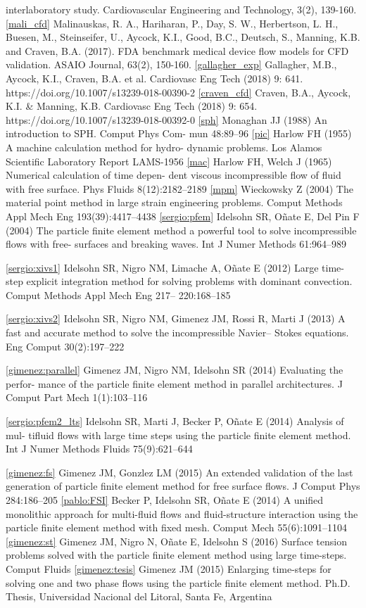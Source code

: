 interlaboratory study. Cardiovascular Engineering and Technology, 3(2), 139-160.
\ref{mali_cfd} Malinauskas, R. A., Hariharan, P., Day, S. W., Herbertson, L. H., Buesen, M., Steinseifer, U., Aycock, K.I., Good, B.C., Deutsch,
S., Manning, K.B. and Craven, B.A. (2017). FDA benchmark medical device flow models for CFD validation. ASAIO Journal,
63(2), 150-160.
\ref{gallagher_exp} Gallagher, M.B., Aycock, K.I., Craven, B.A. et al. Cardiovasc Eng Tech (2018) 9: 641. https://doi.org/10.1007/s13239-018-00390-2
\ref{craven_cfd} Craven, B.A., Aycock, K.I. & Manning, K.B. Cardiovasc Eng Tech (2018) 9: 654. https://doi.org/10.1007/s13239-018-00392-0
\ref{sph} Monaghan JJ (1988) An introduction to SPH. Comput Phys Com-
mun 48:89–96
\ref{pic} Harlow FH (1955) A machine calculation method for hydro-
dynamic problems. Los Alamos Scientific Laboratory Report
LAMS-1956
\ref{mac} Harlow FH, Welch J (1965) Numerical calculation of time depen-
dent viscous incompressible flow of fluid with free surface. Phys
Fluids 8(12):2182–2189
\ref{mpm} Wieckowsky Z (2004) The material point method in large
strain engineering problems. Comput Methods Appl Mech Eng
193(39):4417–4438
\ref{sergio:pfem} Idelsohn SR, Oñate E, Del Pin F (2004) The particle finite element
method a powerful tool to solve incompressible flows with free-
surfaces and breaking waves. Int J Numer Methods 61:964–989

\ref{sergio:xivs1} Idelsohn SR, Nigro NM, Limache A, Oñate E (2012) Large
time-step explicit integration method for solving problems with
dominant convection. Comput Methods Appl Mech Eng 217–
220:168–185

\ref{sergio:xivs2} Idelsohn SR, Nigro NM, Gimenez JM, Rossi R, Marti J (2013)
A fast and accurate method to solve the incompressible Navier–
Stokes equations. Eng Comput 30(2):197–222

\ref{gimenez:parallel} Gimenez JM, Nigro NM, Idelsohn SR (2014) Evaluating the perfor-
mance of the particle finite element method in parallel architectures.
J Comput Part Mech 1(1):103–116

\ref{sergio:pfem2_lts} Idelsohn SR, Marti J, Becker P, Oñate E (2014) Analysis of mul-
tifluid flows with large time steps using the particle finite element
method. Int J Numer Methods Fluids 75(9):621–644

\ref{gimenez:fs} Gimenez JM, Gonzlez LM (2015) An extended validation of the
last generation of particle finite element method for free surface
flows. J Comput Phys 284:186–205
\ref{pablo:FSI} Becker P, Idelsohn SR, Oñate E (2014) A unified monolithic
approach for multi-fluid flows and fluid-structure interaction using
the particle finite element method with fixed mesh. Comput Mech
55(6):1091–1104
\ref{gimenez:st} Gimenez JM, Nigro N, Oñate E, Idelsohn S (2016) Surface tension
problems solved with the particle finite element method using large
time-steps. Comput Fluids
\ref{gimenez:tesis} Gimenez JM (2015) Enlarging time-steps for solving one and two
phase flows using the particle finite element method. Ph.D. Thesis,
Universidad Nacional del Litoral, Santa Fe, Argentina

